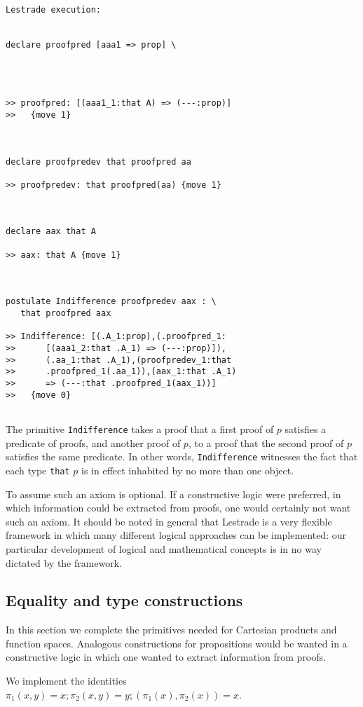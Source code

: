 \documentclass[12pt]{article}
\begin{document}
\begin{verbatim}Lestrade execution:


declare proofpred [aaa1 => prop] \
   



>> proofpred: [(aaa1_1:that A) => (---:prop)]
>>   {move 1}



declare proofpredev that proofpred aa

>> proofpredev: that proofpred(aa) {move 1}



declare aax that A

>> aax: that A {move 1}



postulate Indifference proofpredev aax : \
   that proofpred aax

>> Indifference: [(.A_1:prop),(.proofpred_1:
>>      [(aaa1_2:that .A_1) => (---:prop)]),
>>      (.aa_1:that .A_1),(proofpredev_1:that
>>      .proofpred_1(.aa_1)),(aax_1:that .A_1)
>>      => (---:that .proofpred_1(aax_1))]
>>   {move 0}


\end{verbatim}

The primitive {\tt Indifference} takes a proof that a first proof of $p$ satisfies a predicate of proofs, and another proof of $p$, to a proof that the second proof of $p$ satisfies the same predicate.  In other words, {\tt Indifference} witnesses the fact that each type {\tt that} $p$ is in effect inhabited by no more than one object.

To assume such an axiom is optional.  If a constructive logic were preferred, in which information could be extracted from proofs, one would certainly not want such an axiom.  It should be noted in general that Lestrade is a very flexible framework in which many different logical approaches can be implemented:  our particular development of logical and mathematical concepts is in no way dictated by the framework.

\subsection{Equality and type constructions}

In this section we complete the primitives needed for Cartesian products and function spaces.  Analogous constructions for propositions would be wanted
in a constructive logic in which one wanted to extract information from proofs.

We implement the identities $\pi_1(x,y)=x; \pi_2(x,y)=y; (\pi_1(x),\pi_2(x))=x$.
\end{document}
